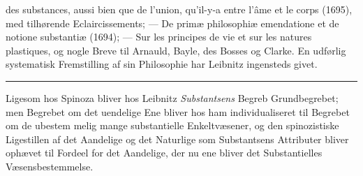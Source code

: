 \documentclass[12pt,a4paper]{book}
\newcommand{\divrule}{\begin{center}\rule{2cm}{0.4pt}\end{center}}
\begin{document}
des substances, aussi bien que de l'union, qu'il-y-a entre
l'âme et le corps (1695), med tilhørende Eclaircissements; ---
De primæ philosophiæ emendatione et de notione substantiæ
(1694); --- Sur les principes de vie et sur les natures plastiques,
og nogle Breve til Arnauld, Bayle, des Bosses og Clarke.
En udførlig systematisk Fremstilling af sin Philosophie har
Leibnitz ingensteds givet.

\divrule

Ligesom hos Spinoza bliver hos Leibnitz \emph{Substantsens}
Begreb Grundbegrebet; men Begrebet om det uendelige Ene
bliver hos ham individualiseret til Begrebet om de ubestem\-%
melig mange substantielle Enkeltvæsener, og den spinozistiske
Ligestillen af det Aandelige og det Naturlige som Substantsens
Attributer bliver ophævet til Fordeel for det Aandelige, der
nu ene bliver det Substantielles Væsensbestemmelse.
\end{document}
